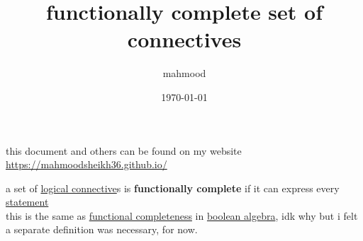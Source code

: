 \documentclass[a4paper,12pt]{article}
\author{mahmood}
\date{\today}
\title{functionally complete set of connectives}
\begin{document}
\maketitle
\begin{note}
this document and others can be found on my website\\
\url{https://mahmoodsheikh36.github.io/}
\end{note}
\begin{definition}
a set of \href{20230401203310-logical_connective.org}{logical connective}s is \textbf{functionally complete} if it can express every \href{20230401175139-statement.org}{statement}\\
this is the same as \href{boolean_algebra.org}{functional completeness} in \href{boolean_algebra.org}{boolean algebra}, idk why but i felt a separate definition was necessary, for now.\\
\end{definition}
\end{document}

